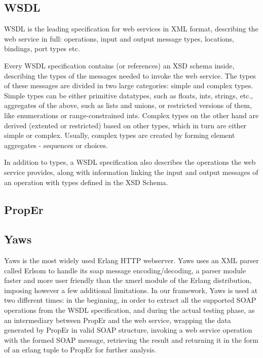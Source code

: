 \documentclass[submission,copyright,a4]{eptcs}
\begin{document}
\subsection{WSDL}

WSDL is the leading specification for web services in XML format, describing the 
web service in full: operations, input and output message types, locations, 
bindings, port types etc.

Every WSDL specification contains (or references) an XSD schema inside, 
describing the types of the messages needed to invoke the web service. The 
types of these messages are divided in two large categories: simple and complex 
types. Simple types can be either primitive datatypes, such as floats, ints, 
strings, etc., aggregates of the above, such as lists and unions, or restricted 
versions of them, like enumerations or range-constrained ints. Complex types on 
the other hand are derived (extented or restricted) based on other types, which 
in turn are either simple or complex. Usually, complex types are created by 
forming element aggregates - sequences or choices. 

In addition to types, a WSDL specification also describes the operations the 
web service provides, along with information linking the input and output 
messages of an operation with types defined in the XSD Schema. 

\subsection{PropEr}

\subsection{Yaws}

Yaws is the most widely used Erlang HTTP webserver. Yaws uses an XML parser 
called Erlsom to handle its soap message encoding/decoding, a parser module 
faster and more user friendly than the xmerl module of the Erlang distribution, 
imposing however a few additional limitations. In our framework, Yaws is used 
at two different times: in the beginning, in order to extract all the supported 
SOAP operations from the WSDL specification, and during the actual testing phase, 
as an intermediary between PropEr and the web service, wrapping the data generated 
by PropEr in valid SOAP structure, invoking a web service operation with the 
formed SOAP message, retrieving the result and returning it in the form of an 
erlang tuple to PropEr for further analysis.
\end{document}
